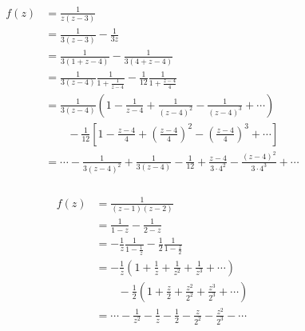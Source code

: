 \documentclass{article}
\begin{document}
\begin{align*}
  f(z) & = \frac{1}{z (z - 3)}                                                                                                                      \\
       & = \frac{1}{3 (z - 3)} - \frac{1}{3 z}                                                                                                      \\
       & = \frac{1}{3 (1 + z - 4)} - \frac{1}{3 (4 + z - 4)}                                                                                        \\
       & = \frac{1}{3 (z - 4)} \frac{1}{1 + \frac{1}{z - 4}} - \frac{1}{12} \frac{1}{1 + \frac{z - 4}{4}}                                           \\
       & = \frac{1}{3 (z - 4)} \left( 1 - \frac{1}{z - 4} + \frac{1}{(z - 4)^2} - \frac{1}{(z - 4)^3} + \cdots \right)                              \\
       & \qquad - \frac{1}{12} \left[ 1 - \frac{z - 4}{4} + \left( \frac{z - 4}{4} \right)^2 - \left( \frac{z - 4}{4} \right)^3 + \cdots \right]    \\
       & = \cdots - \frac{1}{3 (z - 4)^2} + \frac{1}{3 (z - 4)} - \frac{1}{12} + \frac{z - 4}{3 \cdot 4^2} - \frac{(z - 4)^2}{3 \cdot 4^3} + \cdots
\end{align*}

\setcounter{subsubsection}{12}
\subsubsection{}

\begin{align*}
  f(z) & = \frac{1}{(z - 1) (z - 2)}                                                                      \\
       & = \frac{1}{1 - z} - \frac{1}{2 - z}                                                              \\
       & = -\frac{1}{z} \frac{1}{1 - \frac{1}{z}} - \frac{1}{2} \frac{1}{1 - \frac{z}{2}}                 \\
       & = -\frac{1}{z} \left( 1 + \frac{1}{z} + \frac{1}{z^2} + \frac{1}{z^3} + \cdots \right)           \\
       & \qquad - \frac{1}{2} \left( 1 + \frac{z}{2} + \frac{z^2}{2^2} + \frac{z^3}{2^3} + \cdots \right) \\
       & = \cdots - \frac{1}{z^2} - \frac{1}{z} - \frac{1}{2} - \frac{z}{2^2} - \frac{z^2}{2^3} - \cdots
\end{align*}
\end{document}

